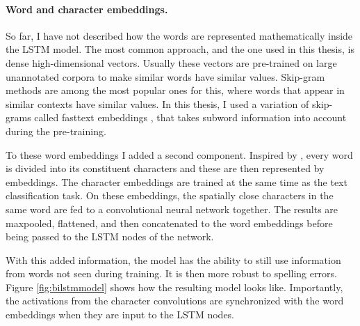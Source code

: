 \documentclass[nofilelist]{cslthse-msc}
\begin{document}
\paragraph{Word and character embeddings.}
So far, I have not described how the words are represented mathematically inside the LSTM model. The most common approach, and the one used in this thesis, is dense high-dimensional vectors. Usually these vectors are pre-trained on large unannotated corpora to make similar words have similar values. Skip-gram methods \citep{mikolov2013efficient} are among the most popular ones for this, where words that appear in similar contexts have similar values. In this thesis, I used  a variation of skip-grams called fasttext embeddings \citep{bojanowski2017enriching}, that takes subword information into account during the pre-training.

To these word embeddings I added a second component. Inspired by \citet{DBLP:journals/corr/ChiuN15}, every word is divided into its constituent characters and these are then represented by embeddings. The character embeddings are trained at the same time as the text classification task. On these embeddings, the spatially close characters in the same word are fed to a convolutional neural network together. The results are maxpooled, flattened, and then concatenated to the word embeddings before being passed to the LSTM nodes of the network. 

With this added information, the model has the ability to still use information from words not seen during training. It is then more robust to spelling errors. Figure \ref{fig:bilstmmodel} shows how the resulting model looks like. Importantly, the activations from the character convolutions are synchronized with the word embeddings when they are input to the LSTM nodes.
\end{document}
